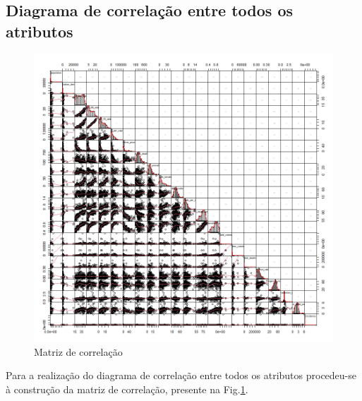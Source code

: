 \documentclass[conference]{IEEEtran}
\begin{document}
\subsection{Diagrama de correlação entre todos os atributos}
\begin{figure}[htbp]
\centerline{\includegraphics[width=0.95\columnwidth]{images/02_1.png}}
\caption{Matriz de correlação}
\label{02_1}
\end{figure}
Para a realização do diagrama de correlação entre todos os atributos procedeu-se à construção da matriz de correlação, presente na Fig.\ref{02_1}.
\end{document}
